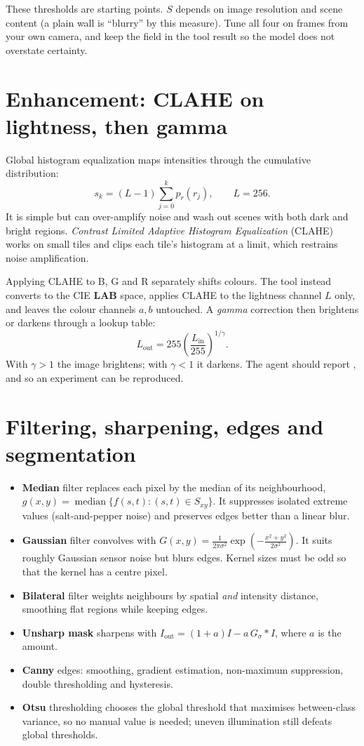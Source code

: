 \begin{warnbox}
These thresholds are starting points. $S$ depends on image resolution and scene content (a plain wall is ``blurry'' by this measure). Tune all four on frames from your own camera, and keep the  field in the tool result so the model does not overstate certainty.
\end{warnbox}

\section{Enhancement: CLAHE on lightness, then gamma}
Global histogram equalization maps intensities through the cumulative distribution:
\[
s_k = (L-1)\sum_{j=0}^{k} p_r(r_j), \qquad L=256.
\]
It is simple but can over-amplify noise and wash out scenes with both dark and bright regions. \emph{Contrast Limited Adaptive Histogram Equalization} (CLAHE) works on small tiles and clips each tile's histogram at a limit, which restrains noise amplification.

Applying CLAHE to B, G and R separately shifts colours. The tool instead converts to the CIE \textbf{LAB} space, applies CLAHE to the lightness channel $L$ only, and leaves the colour channels $a,b$ untouched. A \emph{gamma} correction then brightens or darkens through a lookup table:
\[
L_{\text{out}} = 255\left(\frac{L_{\text{in}}}{255}\right)^{1/\gamma}.
\]
With $\gamma>1$ the image brightens; with $\gamma<1$ it darkens. The agent should report ,  and  so an experiment can be reproduced.

\section{Filtering, sharpening, edges and segmentation}
\begin{itemize}
  \item \textbf{Median} filter replaces each pixel by the median of its neighbourhood, $g(x,y)=\operatorname{median}\{f(s,t):(s,t)\in S_{xy}\}$. It suppresses isolated extreme values (salt-and-pepper noise) and preserves edges better than a linear blur.
  \item \textbf{Gaussian} filter convolves with $G(x,y)=\frac{1}{2\pi\sigma^2}\exp\!\left(-\frac{x^2+y^2}{2\sigma^2}\right)$. It suits roughly Gaussian sensor noise but blurs edges. Kernel sizes must be odd so that the kernel has a centre pixel.
  \item \textbf{Bilateral} filter weights neighbours by spatial \emph{and} intensity distance, smoothing flat regions while keeping edges.
  \item \textbf{Unsharp mask} sharpens with $I_{\text{out}}=(1+a)I-a\,G_\sigma{*}I$, where $a$ is the amount.
  \item \textbf{Canny} edges: smoothing, gradient estimation, non-maximum suppression, double thresholding and hysteresis.
  \item \textbf{Otsu} thresholding chooses the global threshold that maximises between-class variance, so no manual value is needed; uneven illumination still defeats global thresholds.
\end{itemize}

